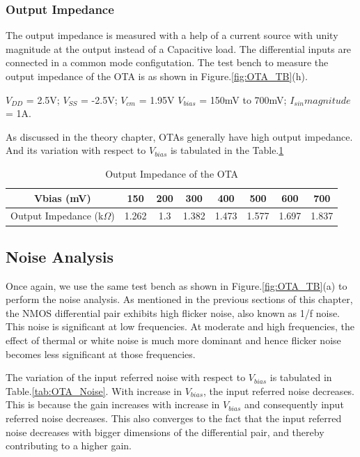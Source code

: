 \subsubsection{Output Impedance}
The output impedance is measured with a help of a current source with unity magnitude at the output instead of a Capacitive load. The differential inputs are connected in a common mode configutation. The test bench to measure the output impedance of the OTA is as shown in Figure.\ref{fig:OTA_TB}(h).

$V_{DD}$ = 2.5V; $V_{SS}$ = -2.5V; $V_{cm}$ = 1.95V $V_{bias}$ = 150mV to 700mV; $I_{sin} magnitude$ = 1A. 
 
As discussed in the theory chapter, OTAs generally have high output impedance. And its variation with respect to $V_{bias}$ is tabulated in the Table.\ref{tab:OTA_ZOUT}
\begin{table} [H]
\centering
\begin{tabular}{@{}cccccccc@{}}
\toprule
Vbias (mV)					& 150		& 200			& 300			& 400			& 500			& 600			& 700 \\ \midrule
Output Impedance (k$\Omega$)			& 1.262		& 1.3		& 1.382		& 1.473		& 1.577		& 1.697		& 1.837 \\
\bottomrule
\end{tabular}
\caption{Output Impedance of the OTA}
\label{tab:OTA_ZOUT}
\end{table}

\subsection{Noise Analysis}

Once again, we use the same test bench as shown in Figure.\ref{fig:OTA_TB}(a) to perform the noise analysis. As mentioned in the previous sections of this chapter, the NMOS differential pair exhibits high flicker noise, also known as 1/f noise. This noise is significant at low frequencies. At moderate and high frequencies, the effect of thermal or white noise is much more dominant and hence flicker noise becomes less significant at those frequencies.

The variation of the input referred noise with respect to $V_{bias}$ is tabulated in Table.\ref{tab:OTA_Noise}. With increase in $V_{bias}$, the input referred noise decreases. This is because the gain increases with increase in $V_{bias}$ and consequently input referred noise decreases. This also converges to the fact that the input referred noise decreases with bigger dimensions of the differential pair, and thereby contributing to a higher gain.

